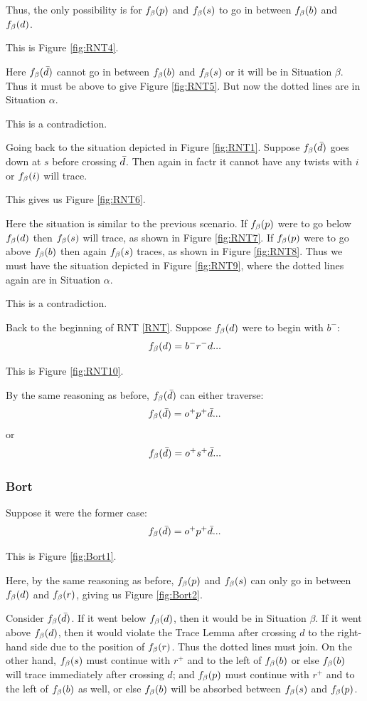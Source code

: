 Thus, the only possibility is for $f_\beta(p)$ and $f_\beta(s)$ to go in between $f_\beta(b)$ and $f_\beta(d)$. 

This is Figure \ref{fig:RNT4}.

Here $f_\beta(\bar{d})$ cannot go in between $f_\beta(b)$ and $f_\beta(s)$ or it will be in Situation $\beta$. Thus it must be above to give Figure \ref{fig:RNT5}. But now the dotted lines are in Situation $\alpha$.

This is a contradiction.

Going back to the situation depicted in Figure \ref{fig:RNT1}. Suppose $f_\beta(\bar{d})$ goes down at $s$ before crossing $\bar{d}$. Then again in factr it cannot have any twists with $i$ or $f_\beta(i)$ will trace.

This gives us Figure \ref{fig:RNT6}.

Here the situation is similar to the previous scenario. If $f_\beta(p)$ were to go below $f_\beta(d)$ then $f_\beta(s)$ will trace, as shown in Figure \ref{fig:RNT7}. If $f_\beta(p)$ were to go above $f_\beta(b)$ then again $f_\beta(s)$ traces, as shown in Figure \ref{fig:RNT8}. Thus we must have the situation depicted in Figure \ref{fig:RNT9}, where the dotted lines again are in Situation $\alpha$.

This is a contradiction.

Back to the beginning of RNT \ref{RNT}. Suppose $f_\beta(d)$ were to begin with $b^-$:
\[
f_\beta(d) = b^- r^- d...
\]

This is Figure \ref{fig:RNT10}.

By the same reasoning as before, $f_\beta(\bar{d})$ can either traverse:
\[
f_\beta(\bar{d}) = o^+ p^+ \bar{d}...
\]
or
\[
f_\beta(\bar{d}) = o^+ s^+ \bar{d}...
\]

\subsubsection{Bort}\label{Bort}
Suppose it were the former case:
\[
f_\beta(\bar{d}) = o^+ p^+ \bar{d}...
\]

This is Figure \ref{fig:Bort1}.

Here, by the same reasoning as before, $f_\beta(p)$ and $f_\beta(s)$ can only go in between $f_\beta(d)$ and $f_\beta(r)$, giving us Figure \ref{fig:Bort2}.

Consider $f_\beta(\bar{d})$. If it went below $f_\beta(d)$, then it would be in Situation $\beta$. If it went above $f_\beta(d)$, then it would violate the Trace Lemma after crossing $d$ to the right-hand side due to the position of $f_\beta(r)$. Thus the dotted lines must join. On the other hand, $f_\beta(s)$ must continue with $r^+$ and to the left of $f_\beta(b)$ or else $f_\beta(b)$ will trace immediately after crossing $d$; and $f_\beta(p)$ must continue with $r^+$ and to the left of $f_\beta(b)$ as well, or else $f_\beta(b)$ will be absorbed between $f_\beta(s)$ and $f_\beta(p)$.

